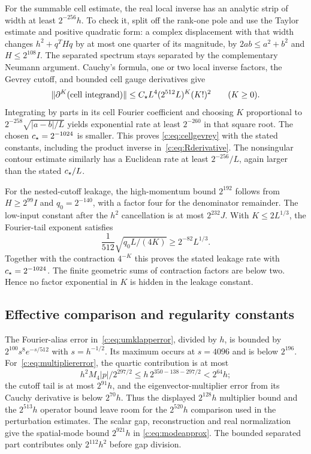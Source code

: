 For the summable cell estimate, the real local inverse has an
analytic strip of width at least $2^{-256}h$. To check it, split
off the rank-one pole and use the Taylor estimate and positive
quadratic form: a complex displacement with that width changes
$h^2+q^THq$ by at most one quarter of its magnitude, by
$2ab\le a^2+b^2$ and $H\le2^{108}I$. The separated spectrum
stays separated by the complementary Neumann argument.
Cauchy's formula, one or two local inverse factors, the Gevrey
cutoff, and bounded cell gauge derivatives give
\[
 \|\partial^K(\hbox{cell integrand})\|
 \le C_\star L^4(2^{512}L)^K(K!)^2\qquad(K\ge0).
\]
Integrating by parts in its cell Fourier coefficient and choosing
$K$ proportional to $2^{-258}\sqrt{|a-b|/L}$ yields exponential
rate at least $2^{-260}$ in that square root. The chosen
$c_\star=2^{-1024}$ is smaller. This proves
\eqref{c:eq:cellgevrey} with the stated constants, including the
product inverse in~\eqref{c:eq:Rderivative}. The nonsingular contour
estimate similarly has a Euclidean rate at least $2^{-256}/L$,
again larger than the stated $c_\star/L$.

For the nested-cutoff leakage, the high-momentum bound $2^{192}$
follows from $H\ge2^{99}I$ and $q_0=2^{-140}$, with a factor four
for the denominator remainder. The low-input constant after the
$h^2$ cancellation is at most $2^{232}J$. With
$K\le2L^{1/3}$, the Fourier-tail exponent satisfies
\[
 \frac1{512}\sqrt{q_0L/(4K)}
 \ge2^{-82}L^{1/3}.
\]
Together with the contraction $4^{-K}$ this proves the stated
leakage rate with $c_\star=2^{-1024}$. The finite geometric sums of
contraction factors are below two. Hence no factor exponential
in $K$ is hidden in the leakage constant.

\subsection{Effective comparison and regularity constants}
The Fourier-alias error in~\eqref{c:eq:umklapperror}, divided by $h$,
is bounded by $2^{100}s^8e^{-s/512}$ with $s=h^{-1/2}$.
Its maximum occurs at $s=4096$ and is below $2^{196}$.
For~\eqref{c:eq:multipliererror}, the quartic contribution is at most
\[
 h^2 M_4|p|/2^{297/2}
 \le h\,2^{350-138-297/2}<2^{64}h;
\]
the cutoff tail is at most $2^{91}h$, and the eigenvector-multiplier
error from its Cauchy derivative is below $2^{70}h$.
Thus the displayed $2^{128}h$ multiplier bound and the
$2^{513}h$ operator bound leave room for the $2^{520}h$ comparison
used in the perturbation estimates. The scalar gap, reconstruction
and real normalization give the spatial-mode bound $2^{921}h$ in
\eqref{c:eq:modeapprox}. The bounded separated part contributes only
$2^{112}h^2$ before gap division.

